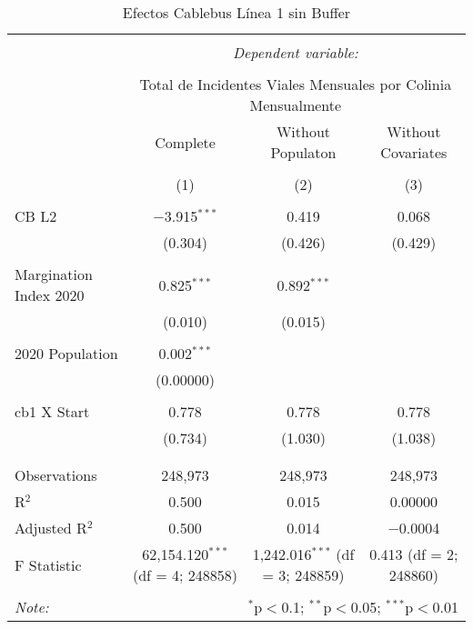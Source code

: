 
\begin{table}[!htbp] \centering 
  \caption{Efectos Cablebus Línea 1 sin Buffer} 
  \label{} 
\begin{tabular}{@{\extracolsep{5pt}}lccc} 
\\[-1.8ex]\hline 
\hline \\[-1.8ex] 
 & \multicolumn{3}{c}{\textit{Dependent variable:}} \\ 
\cline{2-4} 
\\[-1.8ex] & \multicolumn{3}{c}{Total de Incidentes Viales Mensuales por Colinia Mensualmente} \\ 
 & Complete & Without Populaton & Without Covariates \\ 
\\[-1.8ex] & (1) & (2) & (3)\\ 
\hline \\[-1.8ex] 
 CB L2 & $-$3.915$^{***}$ & 0.419 & 0.068 \\ 
  & (0.304) & (0.426) & (0.429) \\ 
  & & & \\ 
 Margination Index 2020 & 0.825$^{***}$ & 0.892$^{***}$ &  \\ 
  & (0.010) & (0.015) &  \\ 
  & & & \\ 
 2020 Population & 0.002$^{***}$ &  &  \\ 
  & (0.00000) &  &  \\ 
  & & & \\ 
 cb1 X Start & 0.778 & 0.778 & 0.778 \\ 
  & (0.734) & (1.030) & (1.038) \\ 
  & & & \\ 
\hline \\[-1.8ex] 
Observations & 248,973 & 248,973 & 248,973 \\ 
R$^{2}$ & 0.500 & 0.015 & 0.00000 \\ 
Adjusted R$^{2}$ & 0.500 & 0.014 & $-$0.0004 \\ 
F Statistic & 62,154.120$^{***}$ (df = 4; 248858) & 1,242.016$^{***}$ (df = 3; 248859) & 0.413 (df = 2; 248860) \\ 
\hline 
\hline \\[-1.8ex] 
\textit{Note:}  & \multicolumn{3}{r}{$^{*}$p$<$0.1; $^{**}$p$<$0.05; $^{***}$p$<$0.01} \\ 
\end{tabular} 
\end{table} 

